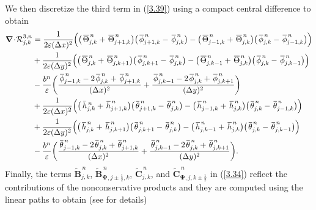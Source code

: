 \documentclass[a4paper,11pt,twoside]{article}
\numberwithin{equation}{section}
\numberwithin{figure}{section}
\numberwithin{table}{section}
\newcommand{\hf}{\frac{1}{2}}
\newcommand{\bnabla}{\bm{\nabla}}
\newcommand{\eps}{\varepsilon}
\newcommand{\dx}{\Delta x}
\newcommand{\dy}{\Delta y}
\newcommand\eref[1]{(\ref{#1})}
\newcommand*\xbar[1]{%
	\hbox{%
		\vbox{%
			\hrule height 0.5pt %
			\kern0.3ex%
			\hbox{%
				\kern-0.05em%
				\ensuremath{#1}%
				\kern-0.02em%
			}%
		}%
	}%
}
\begin{document}
We then discretize the third term in \eref{3.39} using a compact central difference to obtain
\begin{equation}
\begin{aligned}
\bnabla\!\cdot\!{\cal R}_{j,k}^{3,n}&=\frac{1}{2\eps(\dx)^2}\Big(\big(\,\xbar\Theta_{j,k}^{\,n}+\,\xbar\Theta_{j+1,k}^{\,n}\big)
\big(\,\xbar{\phi}_{j+1,k}^{\,n}-\,\xbar{\phi}_{j,k}^{\,n}\big)-\big(\,\xbar\Theta_{j-1,k}^{\,n}+\,\xbar\Theta_{j,k}^{\,n}\big)
\big(\,\xbar{\phi}_{j,k}^{\,n}-\,\xbar{\phi}_{j-1,k}^{\,n}\big)\Big)\\
&+\frac{1}{2\eps(\dy)^2}\Big(\big(\,\xbar\Theta_{j,k}^{\,n}+\,\xbar\Theta_{j,k+1}^{\,n}\big)\big(\,\xbar{\phi}_{j,k+1}^{\,n}
-\,\xbar{\phi}_{j,k}^{\,n}\big)-\big(\,\xbar\Theta_{j,k-1}^{\,n}+\,\xbar\Theta_{j,k}^{\,n}\big)\big(\,\xbar{\phi}_{j,k}^{\,n}
-\,\xbar{\phi}_{j,k-1}^{\,n}\big)\Big)\\
&-\frac{b^n}{\eps}\bigg(\frac{\,\xbar{\phi}^{\,n}_{j-1,k}-2\,\xbar{\phi}^{\,n}_{j,k}+\,\xbar{\phi}^{\,n}_{j+1,k}}{(\dx)^2}+
\frac{\,\xbar{\phi}^{\,n}_{j,k-1}-2\,\xbar{\phi}^{\,n}_{j,k}+\,\xbar{\phi}^{\,n}_{j,k+1}}{(\dy)^2}\bigg)\\
&+\frac{1}{2\eps(\dx)^2}\Big(\big(\,\bar h_{j,k}^{\,n}+\,\xbar h_{j+1,k}^{\,n}\big)\big(\,\xbar\theta_{j+1,k}^{\,n}-
\,\xbar\theta_{j,k}^{\,n}\big)-\big(\,\xbar h_{j-1,k}^{\,n}+\,\xbar h_{j,k}^{\,n}\big)
\big(\,\xbar\theta_{j,k}^{\,n}-\,\xbar\theta_{j-1,k}^{\,n}\big)\Big)\\
&+\frac{1}{2\eps(\dy)^2}\Big(\big(\,\xbar h_{j,k}^{\,n}+\,\xbar h_{j,k+1}^{\,n}\big)\big(\,\xbar\theta_{j,k+1}^{\,n}-
\,\xbar\theta_{j,k}^{\,n}\big)-\big(\,\xbar h_{j,k-1}^{\,n}+\,\xbar h_{j,k}^{\,n}\big)\big(\,\xbar\theta_{j,k}^{\,n}-
\,\xbar\theta_{j,k-1}^{\,n}\big)\Big)\\
&-\frac{b^n}{\eps}\bigg(\frac{\,\xbar\theta^{\,n}_{j-1,k}-2\,\xbar\theta^{\,n}_{j,k}+\,\xbar\theta^{\,n}_{j+1,k}}{(\dx)^2}+
\frac{\,\xbar\theta^{\,n}_{j,k-1}-2\,\xbar\theta^{\,n}_{j,k}+\,\xbar\theta^{\,n}_{j,k+1}}{(\dy)^2}\bigg).	
\end{aligned}
\label{3.42}
\end{equation}
Finally, the terms $\widetilde{\bm B}_{j,k}^{\,n}$, $\widetilde{\bm B}_{\bm\Psi,j\pm\hf,k}^{\,n}$, $\widetilde{\bm C}_{j,k}^{\,n}$, and 
$\widetilde{\bm C}_{\bm\Psi,j,k\pm\hf}^{\,n}$ in \eref{3.34} reflect the contributions of the nonconservative products and they are 
computed using the linear paths to obtain (see \cite{Castro_2019, Chu_2022} for details)
\end{document}
